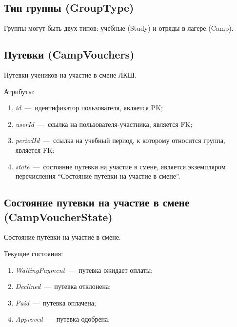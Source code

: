 \documentclass[14pt]{article}
\begin{document}
\subsection{Тип группы (GroupType)}

Группы могут быть двух типов: учебные (Study) и отряды в лагере (Camp).

\subsection{Путевки (CampVouchers)}

Путевки учеников на участие в смене ЛКШ.

Атрибуты:
\begin{enumerate}
	\item \emph{id}~---~идентификатор пользователя, является PK; 
	\item \emph{userId}~---~ссылка на пользователя-участника, является FK;
	\item \emph{periodId}~---~ссылка на учебный период, к которому относится группа, является FK;
	\item \emph{state}~---~состояние путевки на участие в смене, является экземпляром перечисления ``Состояние путевки на участие в смене''. 
\end{enumerate}

\subsection{Состояние путевки на участие в смене (CampVoucherState)}

Состояние путевки на участие в смене.

Текущие состояния:

\begin{enumerate}
	\item \emph{WaitingPayment}~---~путевка ожидает оплаты;
	\item \emph{Declined}~---~путевка отклонена;
	\item \emph{Paid}~---~путевка оплачена;
	\item \emph{Approved}~---~путевка одобрена.
\end{enumerate}
\end{document}
